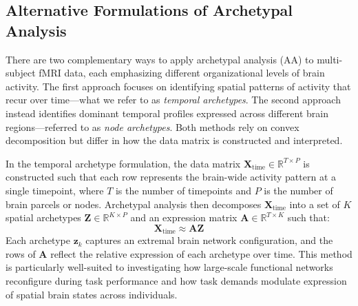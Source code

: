 \documentclass[12pt]{article}
\begin{document}





\subsection*{Alternative Formulations of Archetypal Analysis}

There are two complementary ways to apply archetypal analysis (AA) to multi-subject fMRI data, each emphasizing different organizational levels of brain activity. The first approach focuses on identifying spatial patterns of activity that recur over time—what we refer to as \textit{temporal archetypes}. The second approach instead identifies dominant temporal profiles expressed across different brain regions—referred to as \textit{node archetypes}. Both methods rely on convex decomposition but differ in how the data matrix is constructed and interpreted.

In the temporal archetype formulation, the data matrix $\mathbf{X}_{\text{time}} \in \mathbb{R}^{T \times P}$ is constructed such that each row represents the brain-wide activity pattern at a single timepoint, where $T$ is the number of timepoints and $P$ is the number of brain parcels or nodes. Archetypal analysis then decomposes $\mathbf{X}_{\text{time}}$ into a set of $K$ spatial archetypes $\mathbf{Z} \in \mathbb{R}^{K \times P}$ and an expression matrix $\mathbf{A} \in \mathbb{R}^{T \times K}$ such that:
\[
\mathbf{X}_{\text{time}} \approx \mathbf{A} \mathbf{Z}
\]
Each archetype $\mathbf{z}_k$ captures an extremal brain network configuration, and the rows of $\mathbf{A}$ reflect the relative expression of each archetype over time. This method is particularly well-suited to investigating how large-scale functional networks reconfigure during task performance and how task demands modulate expression of spatial brain states across individuals.
\end{document}
